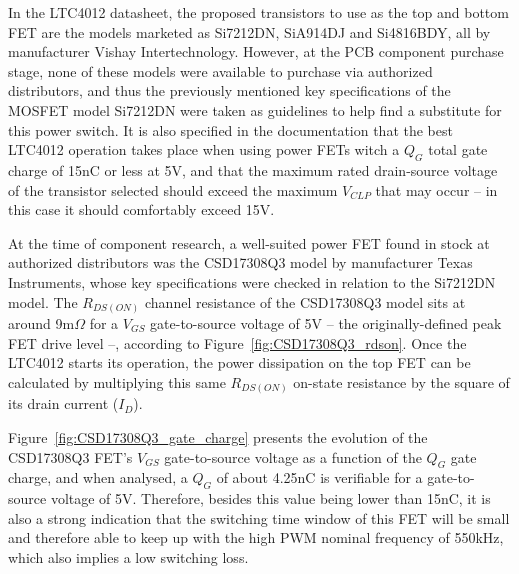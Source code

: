 In the LTC4012 datasheet, the proposed transistors to use as the top and bottom FET are the models marketed as Si7212DN, SiA914DJ and Si4816BDY, all by manufacturer Vishay Intertechnology. However, at the PCB component purchase stage, none of these models were available to purchase via authorized distributors, and thus the previously mentioned key specifications of the MOSFET model Si7212DN were taken as guidelines to help find a substitute for this power switch. It is also specified in the documentation that the best LTC4012 operation takes place when using power FETs witch a $Q_G$ total gate charge of 15nC or less at 5V, and that the maximum rated drain-source voltage of the transistor selected should exceed the maximum $V_{CLP}$ that may occur -- in this case it should comfortably exceed 15V.


At the time of component research, a well-suited power FET found in stock at authorized distributors was the CSD17308Q3 model by manufacturer Texas Instruments, whose key specifications were checked in relation to the Si7212DN model. The $R_{DS(ON)}$ channel resistance of the CSD17308Q3 model sits at around 9m$\Omega$ for a $V_{GS}$ gate-to-source voltage of 5V -- the originally-defined peak FET drive level --, according to Figure~\ref{fig:CSD17308Q3_rdson}.
Once the LTC4012 starts its operation, the power dissipation on the top FET can be calculated by multiplying this same $R_{DS(ON)}$ on-state resistance by the square of its drain current ($I_D$).

Figure~\ref{fig:CSD17308Q3_gate_charge} presents the evolution of the CSD17308Q3 FET's $V_{GS}$ gate-to-source voltage as a function of the $Q_G$ gate charge, and when analysed, a $Q_G$ of about 4.25nC is verifiable for a gate-to-source voltage of 5V. Therefore, besides this value being lower than 15nC, it is also a strong indication that the switching time window of this FET will be small and therefore able to keep up with the high PWM nominal frequency of 550kHz, which also implies a low switching loss.


